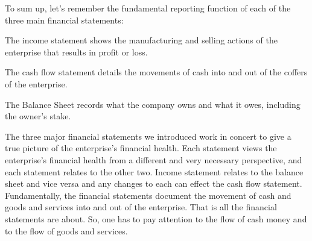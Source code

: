 To sum up, let's remember the fundamental reporting function of each of the three main financial statements:
\bit
\item The income statement shows the manufacturing and selling actions of the enterprise that results in profit or loss.
\item The cash flow statement details the movements of cash into and out of the coffers of the enterprise.
\item The Balance Sheet records what the company owns and what it owes, including the owner's stake.
\eit

The three major financial statements we introduced work in concert to give a true picture of the enterprise's
financial health. Each statement views the enterprise's financial health from a different and very necessary
perspective, and each statement relates to the other two. Income statement relates to the balance sheet and vice
versa and any changes to each can effect the cash flow statement. Fundamentally, the financial statements document
the movement of cash and goods and services into and out of the enterprise. That is all the financial statements are
about. So, one has to pay attention to the flow of cash money and to the flow of goods and services.